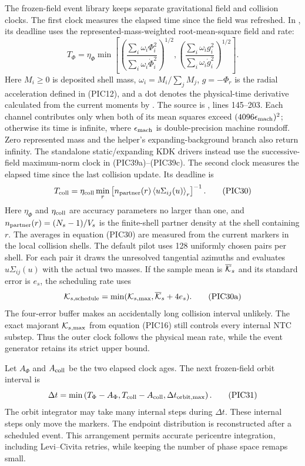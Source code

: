 The frozen-field event library keeps separate gravitational field and
collision clocks.  The first clock measures the elapsed time since the field
was refreshed.  In , its
deadline uses the represented-mass-weighted root-mean-square field and rate:
\[
 T_\Phi=\eta_\Phi\min\left[
 \left(\frac{\sum_i\omega_i\Phi_i^2}
             {\sum_i\omega_i\dot\Phi_i^2}\right)^{1/2},
 \left(\frac{\sum_i\omega_i g_i^2}
             {\sum_i\omega_i\dot g_i^2}\right)^{1/2}
 \right].                                             \tag{PIC29}
\]
Here \(M_i\geq0\) is deposited shell mass,
\(\omega_i=M_i/\sum_jM_j\), \(g=-\Phi_r\) is the radial acceleration defined
in (PIC12), and a dot denotes the physical-time derivative calculated from
the current moments by .  The source is
, lines 145--203.
Each channel contributes only when both of its mean squares exceed
\((4096\epsilon_{\rm mach})^2\); otherwise its time is infinite, where
\(\epsilon_{\rm mach}\) is double-precision machine roundoff.  Zero represented
mass and the helper's expanding-background branch also return infinity.
The standalone static/expanding KDK drivers instead use the successive-field
maximum-norm clock in (PIC39a)--(PIC39c).
The second clock measures the elapsed time since the last collision update.
Its deadline is
 \[
 T_{\rm coll}=\eta_{\rm coll}\min_r
 \left[n_{\rm partner}(r)\left\langle
 u\Sigma_{ij}(u)\right\rangle_r\right]^{-1}.          \tag{PIC30}
\]
Here \(\eta_\Phi\) and \(\eta_{\rm coll}\) are accuracy parameters no larger
than one, and \(n_{\rm partner}(r)=(N_s-1)/V_s\) is the finite-shell partner
density at the shell containing \(r\).  The averages in equation (PIC30) are
measured from the current markers in the local collision shells.  The default
pilot uses 128 uniformly chosen pairs per shell.  For each pair it draws the
unresolved tangential azimuths and evaluates \(u\Sigma_{ij}(u)\) with the
actual two masses.  If the sample mean is \(\overline{\cal K}_s\)
and its standard error is \(e_s\), the scheduling rate uses
\[
 {\cal K}_{s,\rm schedule}=
 \min({\cal K}_{s,\max},\overline{\cal K}_s+4e_s).      \tag{PIC30a}
\]
The four-error buffer makes an accidentally long collision interval unlikely.
The exact majorant \({\cal K}_{s,\max}\) from equation (PIC16) still controls every
internal NTC substep.  Thus the outer clock follows the physical mean rate,
while the event generator retains its strict upper bound.

Let \(A_\Phi\) and \(A_{\rm coll}\) be the two elapsed clock ages.  The next
frozen-field orbit interval is
\[
 \Delta t=\min\left(T_\Phi-A_\Phi,
                    T_{\rm coll}-A_{\rm coll},
                    \Delta t_{\rm orbit,max}\right).  \tag{PIC31}
\]
The orbit integrator may take many internal steps during \(\Delta t\).  These
internal steps only move the markers.  The endpoint distribution is
reconstructed after a scheduled event.  This arrangement permits accurate
pericentre integration, including Levi--Civita retries, while keeping the
number of phase space remaps small.

